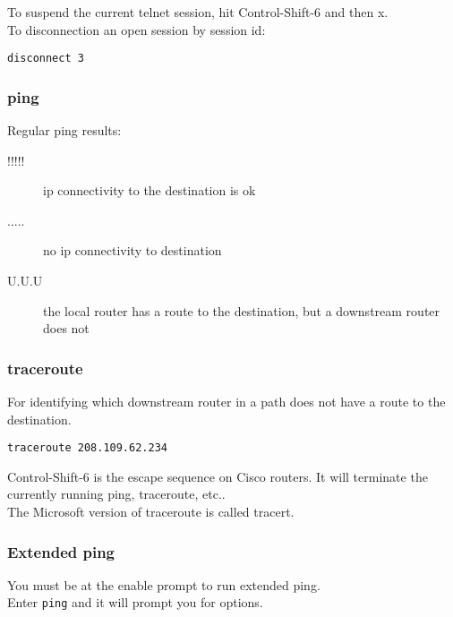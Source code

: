 To suspend the current telnet session, hit Control-Shift-6 and then x.\\

To disconnection an open session by session id:

\begin{verbatim}
disconnect 3
\end{verbatim}

\subsubsection{ping}

Regular ping results:

\begin{description}

\item[!!!!!]
ip connectivity to the destination is ok

\item[.....]
no ip connectivity to destination

\item[U.U.U]
the local router has a route to the destination, but a downstream router does
not

\end{description}

\subsubsection{traceroute}

For identifying which downstream router in a path does not have a route to
the destination.

\begin{verbatim}
traceroute 208.109.62.234
\end{verbatim}

Control-Shift-6 is the escape sequence on Cisco routers. It will terminate
the currently running ping, traceroute, etc..\\

The Microsoft version of traceroute is called tracert.

\subsubsection{Extended ping}

You must be at the enable prompt to run extended ping.\\

Enter \texttt{ping} and it will prompt you for options.


